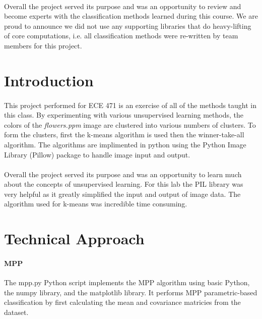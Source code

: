 \documentclass{article}
\begin{document}
\paragraph{}
Overall the project served its purpose and was an opportunity to review and become experts
with the classification methods learned during this course.  We are proud to announce we
did not use any supporting libraries that do heavy-lifting of core computations, i.e. all
classification methods were re-written by team members for this project.
\newpage


\section*{Introduction}
\paragraph{}
This project performed for ECE 471 is an exercise of all of the methods taught in this class.
By experimenting with various unsupervised learning methods, the colors
of the \textit{flowers.ppm} image are clustered into various numbers of clusters.
To form the clusters, first the k-means algorithm is used then the 
winner-take-all algorithm. The algorithms are implimented in python
using the Python Image Library (Pillow) package to handle image input and 
output.

\paragraph{} 
Overall the project served its purpose and was an opportunity to learn
much about the concepts of unsupervised learning. For this lab the 
PIL library was very helpful as it greatly simplified the input and output
of image data. The algorithm used for k-means was incredible time consuming.
\newpage


\section*{Technical Approach}
\paragraph{MPP} 
The mpp.py Python script implements the MPP algorithm using basic Python, the numpy library,
and the matplotlib library.  It performs MPP parametric-based classification by first
calculating the mean and covariance matricies from the dataset.
\end{document}
